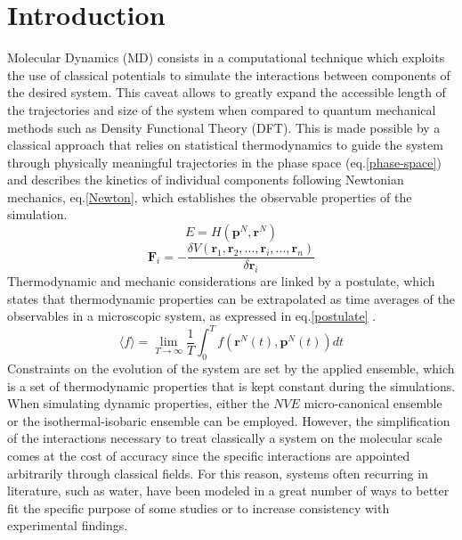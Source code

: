 \documentclass[
	12pt, %
]{fphw}
\begin{document}
\section{Introduction}
Molecular Dynamics (MD) consists in a computational technique which exploits the use of classical potentials to simulate the interactions between components of the desired system.
This caveat allows to greatly expand the accessible length of the trajectories and size of the system when compared to quantum mechanical methods such as Density Functional Theory (DFT).
This is made possible by a classical approach that relies on statistical thermodynamics to guide the system through physically meaningful trajectories in the phase space (eq.\ref{phase-space}) and describes the kinetics of individual components following Newtonian mechanics, eq.\ref{Newton}, which establishes the observable properties of the simulation.
\begin{equation}
	E = H (\textbf{p}^{N}, \textbf{r}^{N})
	\label{phase-space}
\end{equation}
\begin{equation}
	\textbf{F}_{i} = -\frac{\delta V(\textbf{r}_{1}, \textbf{r}_{2},..., \textbf{r}_{i},..., \textbf{r}_{n})}{\delta \textbf{r}_{i}}
	\label{Newton}
\end{equation}
Thermodynamic and mechanic considerations are linked by a postulate, which states that thermodynamic properties can be extrapolated as time averages of the observables in a microscopic system, as expressed in eq.\ref{postulate} .
\begin{equation}
	\langle f\rangle = \lim\limits_{T \to \infty} \frac{1}{T} \int_{0}^{T} f(\textbf{r}^{N}(t),\textbf{p}^{N}(t)) dt 
	\label{postulate}
\end{equation}
Constraints on the evolution of the system are set by the applied ensemble, which is a set of thermodynamic properties that is kept constant during the simulations.
When simulating dynamic properties, either the $NVE$ micro-canonical ensemble\cite{mark_structure_2001} or the isothermal-isobaric ensemble\cite{jorgensen_comparison_1983} can be employed.
However, the simplification of the interactions necessary to treat classically a system on the molecular scale comes at the cost of accuracy since the specific interactions are appointed arbitrarily through classical fields.
For this reason, systems often recurring in literature, such as water, have been modeled in a great number of ways to better fit the specific purpose of some studies or to increase consistency with experimental findings.\cite{tsimpanogiannis_self-diffusion_2019}
\end{document}
